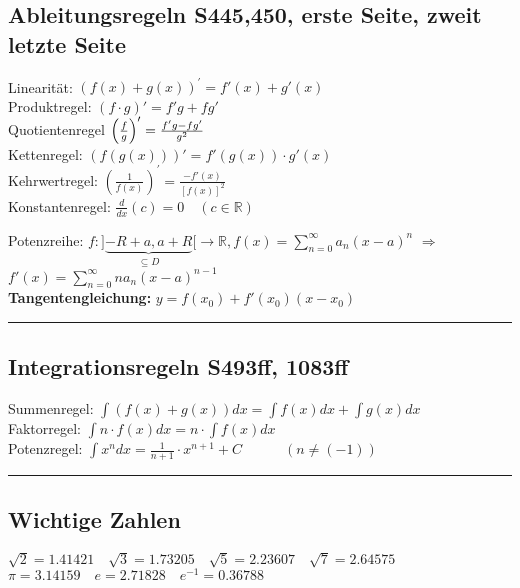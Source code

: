 \subsection{Ableitungsregeln \color{red}S445,450, erste Seite, zweit letzte Seite}
	\vspace{-2mm}										%
	\begin{multicols}{2}
		Linearität: $\left(f(x) + g(x)\right)^{'} = f'(x) + g'(x)$\\
		Produktregel: $(f \cdot g)' = f' g + f g'$\\
		Quotientenregel $\left(\frac{f}{g}\right)' = \frac{f'g - fg'}{g^2}$\\
		Kettenregel: $\left( f(g(x)) \right)' = f'(g(x)) \cdot g'(x)$\\
		Kehrwertregel: $\left( \frac{1}{f(x)} \right)^{'} = \frac{-f'(x)}{[f(x)]^{2}}$\\
		Konstantenregel: $ \frac{d}{dx}(c) = 0 \quad (c \in \mathbb{R})$
	\end{multicols}
		
		Potenzreihe: $f: ] \underbrace{-R+a, a+R}_{\subseteq D}	 [ \rightarrow \mathbb R, f(x) = \sum_{n=0}^{\infty} a_n (x -a)^n$ \quad $\Rightarrow$ \quad $f'(x) = \sum_{n=0}^{\infty} n a_{n} (x-a)^{n-1}$\\
		\textbf{Tangentengleichung:} $y=f(x_0)+f'(x_0)(x-x_0)$
		
\vspace{1mm}
\hrule
		
\subsection{Integrationsregeln \color{red}S493ff, 1083ff}
	\vspace{-2mm}										%
	\begin{multicols}{2}	
		Summenregel:
		$ \int{\left(f(x) + g(x) \right)} dx = \int f(x) dx + \int g(x) dx $ \\[1mm]
		Faktorregel:
		$ \int n \cdot f(x) dx = n \cdot \int f(x) dx $ \\[1mm]
		Potenzregel:
		$ \int x^n dx = \frac{1}{n+1} \cdot x^{n+1} + C  \qquad \quad (n \neq (-1))$\\
	\end{multicols}

		\vspace{1mm}
\hrule

		
\subsection{Wichtige Zahlen}
	$ \sqrt{2} = 1.41421 \quad \sqrt{3} = 1.73205 \quad \sqrt{5} = 2.23607 \quad\sqrt{7} = 2.64575$ \quad
	$ \pi = 3.14159 \quad e = 2.71828 \quad e^{-1} = 0.36788 $
	